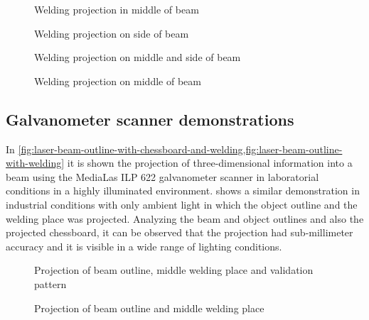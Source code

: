 \begin{figure}[H]
	\begin{floatrow}[2]
		{\caption{Welding projection in middle of beam}\label{fig:dlp-welding-place}}
		{\caption{Welding projection on side of beam}\label{fig:dlp-side-projection}}
	\end{floatrow}
\end{figure}

\begin{figure}[H]
	\begin{floatrow}[2]
		{\caption{Welding projection on middle and side of beam}\label{fig:dlp-welding-place-middle-and-side-red}}
		{\caption{Welding projection on middle of beam}\label{fig:dlp-welding-place-with-object}}
	\end{floatrow}
\end{figure}


\subsection{Galvanometer scanner demonstrations}

In \cref{fig:laser-beam-outline-with-chessboard-and-welding,fig:laser-beam-outline-with-welding} it is shown the projection of three-dimensional information into a beam using the MediaLas ILP 622 galvanometer scanner in laboratorial conditions in a highly illuminated environment.  shows a similar demonstration in industrial conditions with only ambient light in which the object outline and the welding place was projected. Analyzing the beam and object outlines and also the projected chessboard, it can be observed that the projection had sub-millimeter accuracy and it is visible in a wide range of lighting conditions.

\begin{figure}[H]
	\begin{floatrow}[2]
		{\caption{Projection of beam outline, middle welding place and validation pattern}\label{fig:laser-beam-outline-with-chessboard-and-welding}}
		{\caption{Projection of beam outline and middle welding place}\label{fig:laser-beam-outline-with-welding}}
	\end{floatrow}
\end{figure}

